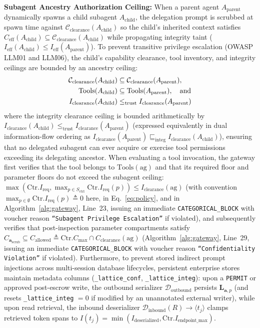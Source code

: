 \documentclass[conference,10pt]{IEEEtran}
\begin{document}
\noindent\textbf{Subagent Ancestry Authorization Ceiling:} When a parent agent $A_{\text{parent}}$ dynamically spawns a child subagent $A_{\text{child}}$, the delegation prompt is scrubbed at spawn time against $\mathcal{C}_{\text{clearance}}(A_{\text{child}})$ so the child's inherited context satisfies $C_{\text{eff}}(A_{\text{child}}) \subseteq \mathcal{C}_{\text{clearance}}(A_{\text{child}})$ while propagating integrity taint ($I_{\text{eff}}(A_{\text{child}}) \le I_{\text{eff}}(A_{\text{parent}})$). To prevent transitive privilege escalation (OWASP LLM01 and LLM06), the child's capability clearance, tool inventory, and integrity ceilings are bounded by an ancestry ceiling:
\begin{align}
\mathcal{C}_{\text{clearance}}(A_{\text{child}}) &\subseteq \mathcal{C}_{\text{clearance}}(A_{\text{parent}}), \notag \\
\text{Tools}(A_{\text{child}}) &\subseteq \text{Tools}(A_{\text{parent}}), \quad \text{and} \notag \\
I_{\text{clearance}}(A_{\text{child}}) &\le_{\text{trust}} I_{\text{clearance}}(A_{\text{parent}})
\end{align}
where the integrity clearance ceiling is bounded arithmetically by $I_{\text{clearance}}(A_{\text{child}}) \le_{\text{trust}} I_{\text{clearance}}(A_{\text{parent}})$ (expressed equivalently in dual information-flow ordering as $I_{\text{clearance}}(A_{\text{parent}}) \sqsubseteq_{\text{integ}} I_{\text{clearance}}(A_{\text{child}})$), ensuring that no delegated subagent can ever acquire or exercise tool permissions exceeding its delegating ancestor. When evaluating a tool invocation, the gateway first verifies that the tool belongs to $\text{Tools}(\text{ag})$ and that its required floor and parameter floors do not exceed the subagent ceiling: $\max(\text{Ctr}.I_{\text{req}}, \max_{p \in S_{\text{ctrl}}} \text{Ctr}.I_{\text{req}}(p)) \le I_{\text{clearance}}(\text{ag})$ (with convention $\max_{p \in \emptyset} \text{Ctr}.I_{\text{req}}(p) \triangleq 0$ here, in Eq.~\ref{eq:policy}, and in Algorithm~\ref{alg:gateway}, Line~23, issuing an immediate \texttt{CATEGORICAL\_BLOCK} with voucher reason \texttt{``Subagent Privilege Escalation''} if violated), and subsequently verifies that post-inspection parameter compartments satisfy $C_{\mathbf{a}_{\text{scrub}}} \subseteq C_{\text{allowed}} \triangleq \text{Ctr}.C_{\text{max}} \cap C_{\text{clearance}}(\text{ag})$ (Algorithm~\ref{alg:gateway}, Line~29, issuing an immediate \texttt{CATEGORICAL\_BLOCK} with voucher reason \texttt{``Confidentiality Violation''} if violated). Furthermore, to prevent stored indirect prompt injections across multi-session database lifecycles, persistent enterprise stores maintain metadata columns (\texttt{\_lattice\_conf}, \texttt{\_lattice\_integ}): upon a \texttt{PERMIT} or approved post-escrow write, the outbound serializer $\mathcal{D}_{\text{outbound}}$ persists $\mathbf{L}_{\mathbf{a}, p}$ (and resets \texttt{\_lattice\_integ} $= 0$ if modified by an unannotated external writer), while upon read retrieval, the inbound deserializer $\mathcal{D}_{\text{inbound}}(R) \to \langle t_j \rangle$ clamps retrieved token spans to $I(t_j) = \min(I_{\text{deserialized}}, \text{Ctr}.I_{\text{endpoint\_max}})$.
\end{document}
